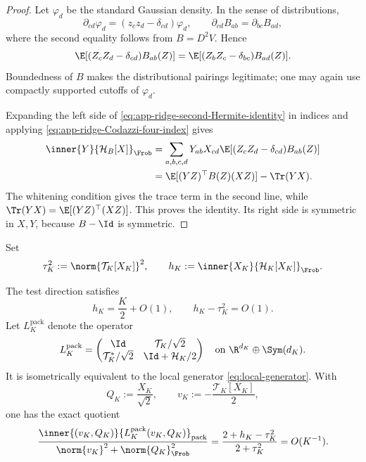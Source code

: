 \begin{proof}
Let \(\varphi_d\) be the standard Gaussian density.  In the sense of
distributions,
\[
  \partial_{cd}\varphi_d=(z_cz_d-\delta_{cd})\varphi_d,
  \qquad
  \partial_{cd}B_{ab}=\partial_{bc}B_{ad},
\]
where the second equality follows from \(B=D^2V\).  Hence
\begin{equation}
  \E[(Z_cZ_d-\delta_{cd})B_{ab}(Z)]
  =
  \E[(Z_bZ_c-\delta_{bc})B_{ad}(Z)].
  \label{eq:app-ridge-Codazzi-four-index}
\end{equation}
Boundedness of \(B\) makes the distributional pairings legitimate; one may
again use compactly supported cutoffs of \(\varphi_d\).

Expanding the left side of
\eqref{eq:app-ridge-second-Hermite-identity} in indices and applying
\eqref{eq:app-ridge-Codazzi-four-index} gives
\begin{align*}
  \inner{Y}{\mathcal H_B[X]}_{\Frob}
  &=
  \sum_{a,b,c,d}Y_{ab}X_{cd}
  \E[(Z_cZ_d-\delta_{cd})B_{ab}(Z)]\\
  &=
  \E[(YZ)^\top B(Z)(XZ)]-\Tr(YX).
\end{align*}
The whitening condition gives the trace term in the second line, while
\(\Tr(YX)=\E[(YZ)^\top(XZ)]\).  This proves the identity.  Its right side is
symmetric in \(X,Y\), because \(B-\Id\) is symmetric.
\end{proof}

Set
\begin{equation}
  \tau_K^2:=\norm{\mathcal T_K[X_K]}^2,\qquad
  h_K:=\inner{X_K}{\mathcal H_K[X_K]}_{\Frob}.
  \label{eq:app-ridge-tau-h}
\end{equation}

\begin{lemma}
\label{lem:app-ridge-Rayleigh}
The test direction satisfies
\begin{equation}
  h_K=\frac K2+O(1),\qquad
  h_K-\tau_K^2=O(1).
  \label{eq:app-ridge-second-Hermite-asymptotics}
\end{equation}
Let \(L_K^{\mathrm{pack}}\) denote the operator
\begin{equation}
  L_K^{\mathrm{pack}}
  =
  \begin{pmatrix}
    \Id&\mathcal T_K/\sqrt2\\
    \mathcal T_K^\ast/\sqrt2&\Id+\mathcal H_K/2
  \end{pmatrix}
  \quad\text{on }\R^{d_K}\oplus\Sym(d_K).
  \label{eq:app-ridge-packed-generator}
\end{equation}
It is isometrically equivalent to the local generator
\eqref{eq:local-generator}.  With
\begin{equation}
  Q_K:=\frac{X_K}{\sqrt2},\qquad
  v_K:=-\frac{\mathcal T_K[X_K]}2,
  \label{eq:app-ridge-Rayleigh-vector}
\end{equation}
one has the exact quotient
\begin{equation}
  \frac{
    \inner{(v_K,Q_K)}
    {L_K^{\mathrm{pack}}(v_K,Q_K)}_{\mathrm{pack}}
  }{
    \norm{v_K}^2+\norm{Q_K}_{\Frob}^2
  }
  =
  \frac{2+h_K-\tau_K^2}{2+\tau_K^2}
  =O(K^{-1}).
  \label{eq:app-ridge-rayleigh}
\end{equation}
\end{lemma}


